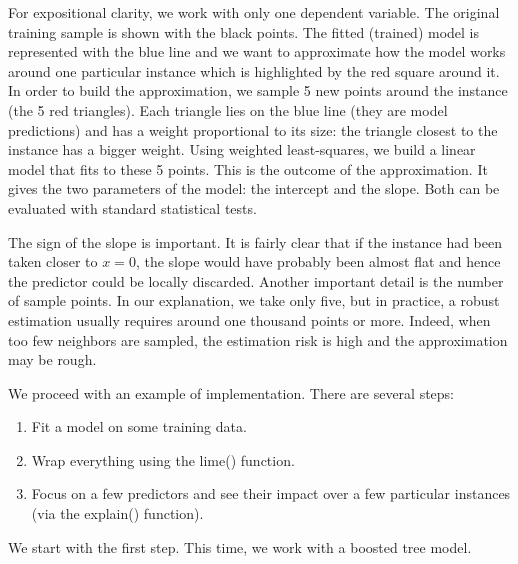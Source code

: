 \documentclass[]{krantz}
\providecommand{\tightlist}{%
  \setlength{\itemsep}{0pt}\setlength{\parskip}{0pt}}
\theoremstyle{definition}
\theoremstyle{definition}
\theoremstyle{definition}
\theoremstyle{remark}
\begin{document}
For expositional clarity, we work with only one dependent variable. The
original training sample is shown with the black points. The fitted
(trained) model is represented with the blue line and we want to
approximate how the model works around one particular instance which is
highlighted by the red square around it. In order to build the
approximation, we sample 5 new points around the instance (the 5 red
triangles). Each triangle lies on the blue line (they are model
predictions) and has a weight proportional to its size: the triangle
closest to the instance has a bigger weight. Using weighted
least-squares, we build a linear model that fits to these 5 points. This
is the outcome of the approximation. It gives the two parameters of the
model: the intercept and the slope. Both can be evaluated with standard
statistical tests.

The sign of the slope is important. It is fairly clear that if the
instance had been taken closer to \(x=0\), the slope would have probably
been almost flat and hence the predictor could be locally discarded.
Another important detail is the number of sample points. In our
explanation, we take only five, but in practice, a robust estimation
usually requires around one thousand points or more. Indeed, when too
few neighbors are sampled, the estimation risk is high and the
approximation may be rough.

We proceed with an example of implementation. There are several steps:

\begin{enumerate}
\def\labelenumi{\arabic{enumi}.}
\tightlist
\item
  Fit a model on some training data.\\
\item
  Wrap everything using the lime() function.\\
\item
  Focus on a few predictors and see their impact over a few particular
  instances (via the explain() function).
\end{enumerate}

We start with the first step. This time, we work with a boosted tree
model.

\footnotesize
\end{document}
